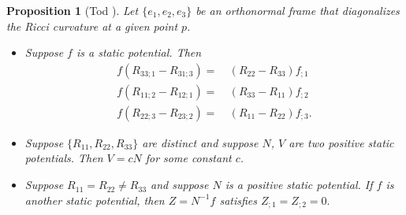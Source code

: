 \documentclass[12pt]{amsart}
\newtheorem{prop}{Proposition}[section]
\theoremstyle{remark}
\numberwithin{equation}{section}
\begin{document}
\begin{prop}[Tod \cite{Tod-2000}]  \label{prop-tod}
Let $ \{ e_1, e_2, e_3 \}$ be an orthonormal frame that diagonalizes the Ricci curvature at a given point $p$.
\begin{itemize}

\item[(i)]  Suppose  $ f $ is a static potential.  Then
\begin{equation*} \label{eq-tod}
\begin{split}
 f ( R_{33;1} - R_{31;3} ) = & \ ( R_{22} - R_{33} ) f_{;1}  \\
 f ( R_{11;2} - R_{12;1} ) =  & \ ( R_{33} - R_{11} ) f_{;2}  \\
 f ( R_{22;3} - R_{23;2} ) = & \ ( R_{11} - R_{22} ) f_{;3}  .
 \end{split}
 \end{equation*}

\item[(ii)] Suppose $ \{ R_{11}, R_{22}, R_{33 } \} $ are  distinct and  suppose $ N$, $V$ are two positive static potentials.
Then $ V = c N$ for some constant $c$.

\item[(iii)] Suppose $ R_{11} = R_{22} \neq R_{33}$ and suppose $ N$ is a positive static potential. If $ f $ is another static potential,
then $ Z = N^{-1} f $ satisfies
$ Z_{;1} = Z_{; 2} = 0 . $


\end{itemize}


\end{prop}
\end{document}
